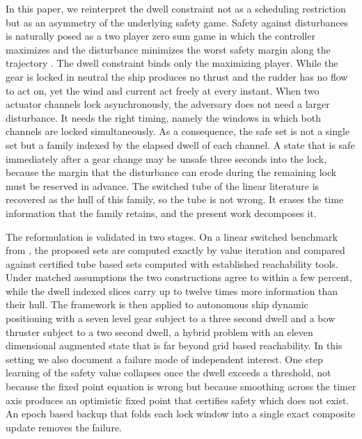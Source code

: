 \documentclass[journal]{IEEEtran}
\begin{document}
In this paper, we reinterpret the dwell constraint not as a scheduling restriction but as an asymmetry of the underlying safety game. Safety against disturbances is naturally posed as a two player zero sum game in which the controller maximizes and the disturbance minimizes the worst safety margin along the trajectory \cite{bansal2017,isaacs1965}. The dwell constraint binds only the maximizing player. While the gear is locked in neutral the ship produces no thrust and the rudder has no flow to act on, yet the wind and current act freely at every instant. When two actuator channels lock asynchronously, the adversary does not need a larger disturbance. It needs the right timing, namely the windows in which both channels are locked simultaneously. As a consequence, the safe set is not a single set but a family indexed by the elapsed dwell of each channel. A state that is safe immediately after a gear change may be unsafe three seconds into the lock, because the margin that the disturbance can erode during the remaining lock must be reserved in advance. The switched tube of the linear literature \cite{zhang2016} is recovered as the hull of this family, so the tube is not wrong. It erases the time information that the family retains, and the present work decomposes it.

The reformulation is validated in two stages. On a linear switched benchmark from \cite{zhang2016}, the proposed sets are computed exactly by value iteration and compared against certified tube based sets computed with established reachability tools. Under matched assumptions the two constructions agree to within a few percent, while the dwell indexed slices carry up to twelve times more information than their hull. The framework is then applied to autonomous ship dynamic positioning with a seven level gear subject to a three second dwell and a bow thruster subject to a two second dwell, a hybrid problem with an eleven dimensional augmented state that is far beyond grid based reachability. In this setting we also document a failure mode of independent interest. One step learning of the safety value collapses once the dwell exceeds a threshold, not because the fixed point equation is wrong but because smoothing across the timer axis produces an optimistic fixed point that certifies safety which does not exist. An epoch based backup that folds each lock window into a single exact composite update removes the failure.
\end{document}
